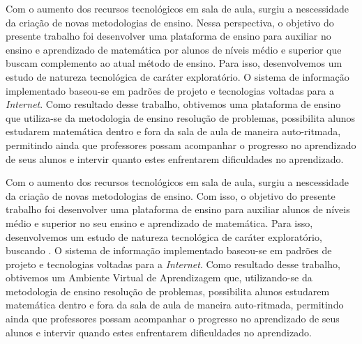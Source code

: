 Com o aumento dos recursos tecnológicos em sala de aula, surgiu a nescessidade da criação de novas metodologias de ensino. Nessa perspectiva, o objetivo do presente trabalho foi desenvolver uma plataforma de ensino para auxiliar no ensino e aprendizado de matemática por alunos de níveis médio e superior que buscam complemento ao atual método de ensino. Para isso, desenvolvemos um estudo de natureza tecnológica de caráter exploratório. O sistema de informação implementado baseou-se em padrões de projeto e tecnologias voltadas para a \textit{Internet}. Como resultado desse trabalho, obtivemos uma plataforma de ensino que utiliza-se da metodologia de ensino resolução de problemas, possibilita alunos estudarem matemática dentro e fora da sala de aula de maneira auto-ritmada, permitindo ainda que professores possam acompanhar o progresso no aprendizado de seus alunos e intervir quanto estes enfrentarem dificuldades no aprendizado.   

Com o aumento dos recursos tecnológicos em sala de aula, surgiu a nescessidade da criação de novas metodologias de ensino. Com isso, o objetivo do presente trabalho foi desenvolver uma plataforma de ensino para auxiliar alunos de níveis médio e superior no seu ensino e aprendizado de matemática. Para isso, desenvolvemos um estudo de natureza tecnológica de caráter exploratório, buscando . O sistema de informação implementado baseou-se em padrões de projeto e tecnologias voltadas para a \textit{Internet}. Como resultado desse trabalho, obtivemos um Ambiente Virtual de Aprendizagem que, utilizando-se da metodologia de ensino resolução de problemas, possibilita alunos estudarem matemática dentro e fora da sala de aula de maneira auto-ritmada, permitindo ainda que professores possam acompanhar o progresso no aprendizado de seus alunos e intervir quando estes enfrentarem dificuldades no aprendizado. 



